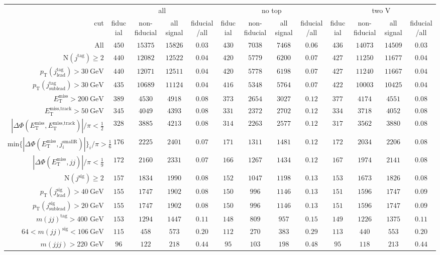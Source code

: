 \begin{tabular}{r|c|c|c|c|c|c|c|c|c|c|c|c|}
 &\multicolumn{4}{|c|}{all}&\multicolumn{4}{c|}{no top}&\multicolumn{4}{|c|}{two V}\\
cut&fiducial&non-fiducial&all signal&fiducial/all&fiducial&non-fiducial&all signal&fiducial/all&fiducial&non-fiducial&all signal&fiducial/all\\
\hline
All&$450$&$15375$&$15826$&$0.03$&$430$&$7038$&$7468$&$0.06$&$436$&$14073$&$14509$&$0.03$\\
$\text{N}(j^\text{tag})\geq2$&$440$&$12082$&$12522$&$0.04$&$420$&$5779$&$6200$&$0.07$&$427$&$11250$&$11677$&$0.04$\\
$p_\text{T}(j^\text{tag}_\text{lead})>30~\text{GeV}$&$440$&$12071$&$12511$&$0.04$&$420$&$5778$&$6198$&$0.07$&$427$&$11240$&$11667$&$0.04$\\
$p_\text{T}(j^\text{tag}_\text{sublead})>30~\text{GeV}$&$435$&$10689$&$11124$&$0.04$&$416$&$5348$&$5764$&$0.07$&$422$&$10003$&$10425$&$0.04$\\
$E_\text{T}^\text{miss} > 200~\text{GeV}$&$389$&$4530$&$4918$&$0.08$&$373$&$2654$&$3027$&$0.12$&$377$&$4174$&$4551$&$0.08$\\
$E_\text{T}^\text{miss,track} > 50~\text{GeV}$&$345$&$4049$&$4393$&$0.08$&$331$&$2372$&$2702$&$0.12$&$334$&$3718$&$4052$&$0.08$\\
$|\Delta\Phi(E_\text{T}^\text{miss},E_\text{T}^\text{miss,track})|/\pi<\frac{1}{2}$&$328$&$3885$&$4213$&$0.08$&$314$&$2263$&$2577$&$0.12$&$317$&$3562$&$3880$&$0.08$\\
$\text{min}\{|\Delta\Phi(E_\text{T}^\text{miss},j^\text{smallR}_i)|\}_i/\pi > \frac{1}{6}$&$176$&$2225$&$2401$&$0.07$&$171$&$1311$&$1481$&$0.12$&$172$&$2034$&$2206$&$0.08$\\
$|\Delta\Phi(E_\text{T}^\text{miss},jj)|/\pi < \frac{1}{9}$&$172$&$2160$&$2331$&$0.07$&$166$&$1267$&$1434$&$0.12$&$167$&$1974$&$2141$&$0.08$\\
$\text{N}(j^\text{sig})\geq2$&$157$&$1834$&$1990$&$0.08$&$152$&$1047$&$1198$&$0.13$&$153$&$1673$&$1826$&$0.08$\\
$p_\text{T}(j^\text{sig}_\text{lead})>40~\text{GeV}$&$155$&$1747$&$1902$&$0.08$&$150$&$996$&$1146$&$0.13$&$151$&$1596$&$1747$&$0.09$\\
$p_\text{T}(j^\text{sig}_\text{sublead})>20~\text{GeV}$&$155$&$1747$&$1902$&$0.08$&$150$&$996$&$1146$&$0.13$&$151$&$1596$&$1747$&$0.09$\\
$m(jj)^\text{tag}>400\text{ GeV}$&$153$&$1294$&$1447$&$0.11$&$148$&$809$&$957$&$0.15$&$149$&$1226$&$1375$&$0.11$\\
$64<m(jj)^\text{sig}<106~\text{GeV}$&$115$&$458$&$573$&$0.20$&$112$&$270$&$383$&$0.29$&$113$&$440$&$553$&$0.20$\\
$m(jjj)>220\text{ GeV}$&$96$&$122$&$218$&$0.44$&$95$&$103$&$198$&$0.48$&$95$&$118$&$213$&$0.44$\\
\end{tabular}

